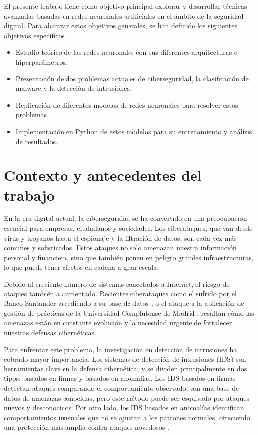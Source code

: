 \newpage


El presente trabajo tiene como objetivo principal explorar y desarrollar técnicas avanzadas basadas en redes neuronales artificiales en el ámbito de la seguridad digital. Para alcanzar estos objetivos generales, se han definido los siguientes objetivos específicos.

\begin{itemize}
\item Estudio teórico de las redes neuronales con sus diferentes arquitecturas e hiperparámetros.

\item Presentación de dos problemas actuales de ciberseguridad, la clasificación de malware y la detección de intrusiones.

\item Replicación de diferentes modelos de redes neuronales para resolver estos problemas.

\item Implementación en Python de estos modelos para su entrenamiento y análisis de resultados.

\end{itemize}

    
\section{Contexto y antecedentes del trabajo} \label{Sec:1_2}

En la era digital actual, la ciberseguridad se ha convertido en una preocupación esencial para empresas, ciudadanos y sociedades. Los ciberataques, que van desde virus y troyanos hasta el espionaje y la filtración de datos, son cada vez más comunes y sofisticados. Estos ataques no solo amenazan nuestra información personal y financiera, sino que también ponen en peligro grandes infraestructuras, lo que puede tener efectos en cadena a gran escala.

Debido al creciente número de sistemas conectados a Internet, el riesgo de ataques también a aumentado. Recientes ciberataques como el sufrido por el Banco Santander accediendo a su base de datos \citep{santander}, o el ataque a la aplicación de gestión de prácticas de la Universidad Complutense de Madrid \citep{compluRobo}, resaltan cómo las amenazas están en constante evolución y la necesidad urgente de fortalecer nuestras defensas cibernéticas.

Para enfrentar este problema, la investigación en detección de intrusiones ha cobrado mayor importancia. Los sistemas de detección de intrusiones (IDS) son herramientas clave en la defensa cibernética, y se dividen principalmente en dos tipos: basados en firmas y basados en anomalías. Los IDS basados en firmas detectan ataques comparando el comportamiento observado, con una base de datos de amenazas conocidas, pero este método puede ser esquivado por ataques nuevos y desconocidos. Por otro lado, los IDS basados en anomalías identifican comportamientos inusuales que no se ajustan a los patrones normales, ofreciendo una protección más amplia contra ataques novedosos \citep{pawlicki2022survey}. 

